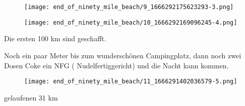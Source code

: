 \begin{figure}[H]
	\centering
	\texttt{[image: end\_of\_ninety\_mile\_beach/9\_1666292175623293-3.png]}
	\caption{}
	\label{fig:9_1666292175623293-3}
\end{figure}

\begin{figure}[H]
	\centering
	\texttt{[image: end\_of\_ninety\_mile\_beach/10\_1666292169096245-4.png]}
	\caption{}
	\label{fig:10_1666292169096245-4}
\end{figure}

  Die ersten 100 km sind geschafft.
 


  Noch ein paar Meter bis zum wunderschönen Campingplatz, dann noch zwei Dosen Coke ein NFG ( Nudelfertiggericht) und die Nacht kann kommen.
 


\begin{figure}[H]
	\centering
	\texttt{[image: end\_of\_ninety\_mile\_beach/11\_1666291402036579-5.png]}
	\caption{}
	\label{fig:11_1666291402036579-5}
\end{figure}

  gelaufenen 31 km
 

